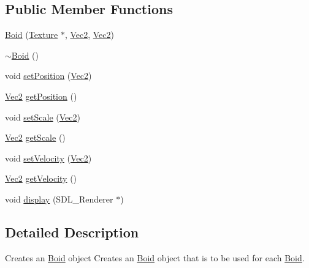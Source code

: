 \subsection*{Public Member Functions}
\begin{DoxyCompactItemize}
\item 
\hyperlink{class_boid_aa0c991f0bbe21209e22fcf81002dab11}{Boid} (\hyperlink{class_texture}{Texture} $\ast$, \hyperlink{struct_vec2}{Vec2}, \hyperlink{struct_vec2}{Vec2})
\item 
\hyperlink{class_boid_a712f84ddc1b8ad06ad7ecd6c10a1666c}{$\sim$\+Boid} ()
\item 
void \hyperlink{class_boid_a62ebe99b4a19edfc2d0a6f1ac58e9658}{set\+Position} (\hyperlink{struct_vec2}{Vec2})
\item 
\hyperlink{struct_vec2}{Vec2} \hyperlink{class_boid_a4f21bfa041637ffcce13c56764fd3c9f}{get\+Position} ()
\item 
void \hyperlink{class_boid_a4443fb5d1fb425b9fede21c3cee2ba84}{set\+Scale} (\hyperlink{struct_vec2}{Vec2})
\item 
\hyperlink{struct_vec2}{Vec2} \hyperlink{class_boid_a3a5d507c214ebd3bf9eda04e2157c4b5}{get\+Scale} ()
\item 
void \hyperlink{class_boid_a8f59ceb20ee2f35705ddd1984d98d5c5}{set\+Velocity} (\hyperlink{struct_vec2}{Vec2})
\item 
\hyperlink{struct_vec2}{Vec2} \hyperlink{class_boid_a3af03753fdadf91e23acd64fb59968c1}{get\+Velocity} ()
\item 
void \hyperlink{class_boid_ad522fbcf60e6e318c785ca7b04091472}{display} (S\+D\+L\+\_\+\+Renderer $\ast$)
\end{DoxyCompactItemize}


\subsection{Detailed Description}
Creates an \hyperlink{class_boid}{Boid} object Creates an \hyperlink{class_boid}{Boid} object that is to be used for each \hyperlink{class_boid}{Boid}. 

